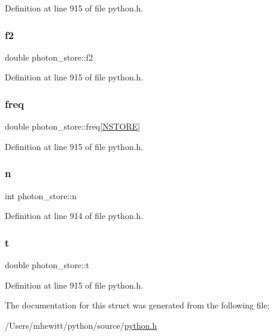 Definition at line 915 of file python.\+h.

\mbox{\label{structphoton__store_a64630dd43adca15e1b6a11eaf32130d7}} 
\subsubsection{\texorpdfstring{f2}{f2}}
{\footnotesize\ttfamily double photon\+\_\+store\+::f2}



Definition at line 915 of file python.\+h.

\mbox{\label{structphoton__store_a0ca5ae358e1d455b4ff924a1a4be00fc}} 
\subsubsection{\texorpdfstring{freq}{freq}}
{\footnotesize\ttfamily double photon\+\_\+store\+::freq\mbox{[}\hyperlink{python_8h_a0ce783ce6592faa3e2f8900e2a72846a}{N\+S\+T\+O\+RE}\mbox{]}}



Definition at line 915 of file python.\+h.

\mbox{\label{structphoton__store_a2c21d7cedb5d14f39c75773d8c27cfb9}} 
\subsubsection{\texorpdfstring{n}{n}}
{\footnotesize\ttfamily int photon\+\_\+store\+::n}



Definition at line 914 of file python.\+h.

\mbox{\label{structphoton__store_a1f66c34e20651382abba394331cee838}} 
\subsubsection{\texorpdfstring{t}{t}}
{\footnotesize\ttfamily double photon\+\_\+store\+::t}



Definition at line 915 of file python.\+h.



The documentation for this struct was generated from the following file\+:\begin{DoxyCompactItemize}
\item 
/\+Users/mhewitt/python/source/\hyperlink{python_8h}{python.\+h}\end{DoxyCompactItemize}

